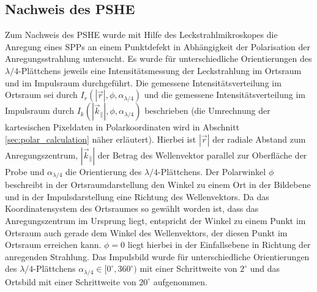 \documentclass[titlepage,  ngerman]{article}
\begin{document}
	\subsection{Nachweis des PSHE}
	Zum Nachweis des PSHE wurde mit Hilfe des Leckstrahlmikroskopes die Anregung eines SPPs an einem Punktdefekt in Abhängigkeit der Polarisation der Anregungsstrahlung untersucht. Es wurde für unterschiedliche Orientierungen des $\lambda /4$-Plättchens jeweils eine Intensitätsmessung der Leckstrahlung im Ortsraum und im Impulsraum durchgeführt. Die gemessene Intensitätsverteilung im Ortsraum sei durch $I_r(|\vec{r}|, \phi, \alpha_{\lambda /4})$ und die gemessene Intensitätsverteilung im Impulsraum durch $I_k(|\vec{k}_\parallel|, \phi, \alpha_{\lambda /4})$ beschrieben (die Umrechnung der kartesischen Pixeldaten in Polarkoordinaten wird in Abschnitt \ref{sec:polar_calculation} näher erläutert). Hierbei ist $|\vec{r}|$ der radiale Abstand zum Anregungszentrum, $|\vec{k}_\parallel|$ der Betrag des Wellenvektor parallel zur Oberfläche der Probe und $\alpha_{\lambda/4}$ die Orientierung des $\lambda/4$-Plättchens. Der Polarwinkel $\phi$ beschreibt in der Ortsraumdarstellung den Winkel zu einem Ort in der Bildebene und in der Impulsdarstellung eine Richtung des Wellenvektors. Da das Koordinatensystem des Ortsraumes so gewählt worden ist, dass das Anregungszentrum im Ursprung liegt, entspricht der Winkel zu einem Punkt im Ortsraum auch gerade dem Winkel des Wellenvektors, der diesen Punkt im Ortsraum erreichen kann. $\phi = 0$ liegt hierbei in der Einfallsebene in Richtung der anregenden Strahlung. Das Impulsbild wurde für unterschiedliche Orientierungen des $\lambda/4$-Plättchens  $\alpha_{\lambda/4} \in [0^\circ,360^\circ)$ mit einer Schrittweite von $2^\circ$ und das Ortsbild mit einer Schrittweite von $20^\circ$ aufgenommen.
	
\end{document}

